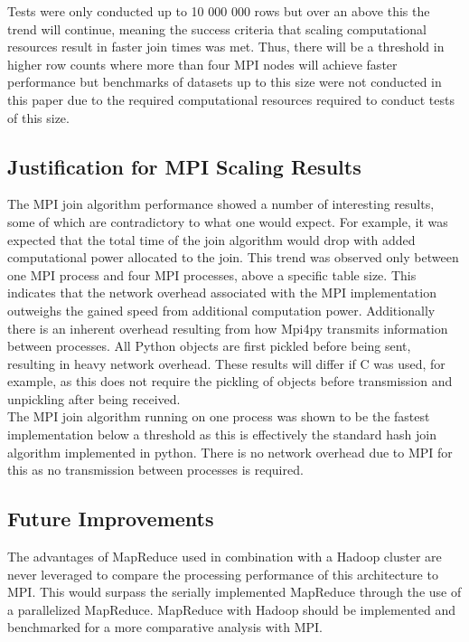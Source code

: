 \documentclass[10.5 pt, conference]{IEEEtran}
\begin{document}
Tests were only conducted up to 10 000 000 rows but over an above this the trend will continue, meaning the success criteria that scaling computational resources result in faster join times was met. Thus, there will be a threshold in higher row counts where more than four MPI nodes will achieve faster performance but benchmarks of datasets up to this size were not conducted in this paper due to the required computational resources required to conduct tests of this size.

\subsection{Justification for MPI Scaling Results}
The MPI join algorithm performance showed a number of interesting results, some of which are contradictory to what one would expect. For example, it was expected that the total time of the join algorithm would drop with added computational power allocated to the join. This trend was observed only between one MPI process and four MPI processes, above a specific table size. This indicates that the network overhead associated with the MPI implementation outweighs the gained speed from additional computation power. Additionally there is an inherent overhead resulting from how Mpi4py transmits information between processes. All Python objects are first pickled before being sent, resulting in heavy network overhead. These results will differ if C was used, for example, as this does not require the pickling of objects before transmission and unpickling after being received\cite{TutorialsPoint2018}.\\

The MPI join algorithm running on one process was shown to be the fastest implementation below a threshold as this is effectively the standard hash join algorithm implemented in python. There is no network overhead due to MPI for this as no transmission between processes is required.

\subsection{Future Improvements}
The advantages of MapReduce used in combination with a Hadoop cluster are never leveraged to compare the processing performance of this architecture to MPI. This would surpass the serially implemented MapReduce through the use of a parallelized MapReduce. MapReduce with Hadoop should be implemented and benchmarked for a more comparative analysis with MPI.  
\end{document}
